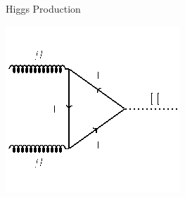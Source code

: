 \documentclass{beamer}
\begin{document}
\begin{frame}{Higgs Production}
    \begin{center}
        \includegraphics[scale=1]{images/higgs.png}
    \end{center}
\end{frame}
\end{document}
